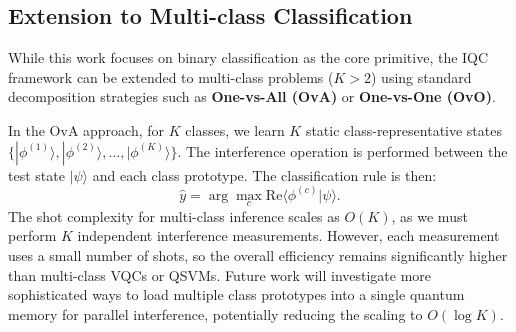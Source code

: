 \documentclass[conference]{IEEEtran}
\begin{document}
\subsection{Extension to Multi-class Classification}

While this work focuses on binary classification as the core primitive, the IQC framework can be extended to multi-class problems ($K > 2$) using standard decomposition strategies such as \textbf{One-vs-All (OvA)} or \textbf{One-vs-One (OvO)}.

In the OvA approach, for $K$ classes, we learn $K$ static class-representative states $\{|\phi^{(1)}\rangle, |\phi^{(2)}\rangle, \dots, |\phi^{(K)}\rangle\}$. The interference operation is performed between the test state $|\psi\rangle$ and each class prototype. The classification rule is then:
\begin{equation}
    \hat{y} = \arg\max_c \mathrm{Re}\langle \phi^{(c)} | \psi \rangle.
\end{equation}
The shot complexity for multi-class inference scales as $O(K)$, as we must perform $K$ independent interference measurements. However, each measurement uses a small number of shots, so the overall efficiency remains significantly higher than multi-class VQCs or QSVMs. Future work will investigate more sophisticated ways to load multiple class prototypes into a single quantum memory for parallel interference, potentially reducing the scaling to $O(\log K)$.
\end{document}
